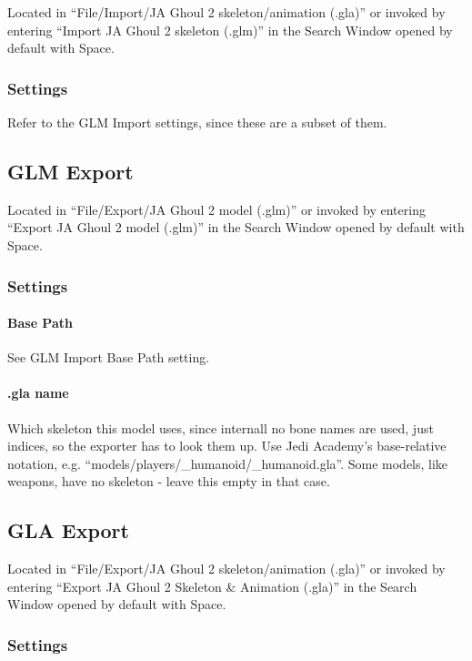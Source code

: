 \documentclass[a4paper,10pt]{article}
\begin{document}
 Located in ``File/Import/JA Ghoul 2 skeleton/animation (.gla)'' or invoked by entering ``Import JA Ghoul 2
 skeleton (.glm)'' in the Search Window opened by default with Space.
 
 \subsubsection*{Settings}
 
 Refer to the GLM Import settings, since these are a subset of them.
 
 
 \subsection{GLM Export}
 
 Located in ``File/Export/JA Ghoul 2 model (.glm)'' or invoked by entering ``Export JA Ghoul 2 model (.glm)''
 in the Search Window opened by default with Space.
 
 \subsubsection*{Settings}
 
 \paragraph*{Base Path}
 See GLM Import Base Path setting.
 
 \paragraph*{.gla name}
 Which skeleton this model uses, since internall no bone names are used, just indices, so the exporter has
 to look them up. Use Jedi Academy's base-relative notation, e.g. ``models/players/\_humanoid/\_humanoid.gla''.
 Some models, like weapons, have no skeleton - leave this empty in that case.
 
 
 \subsection{GLA Export}
 
 Located in ``File/Export/JA Ghoul 2 skeleton/animation (.gla)'' or invoked by entering ``Export JA Ghoul 2 
 Skeleton \& Animation (.gla)'' in the Search Window opened by default with Space.
 
 \subsubsection*{Settings}
 
\end{document}
